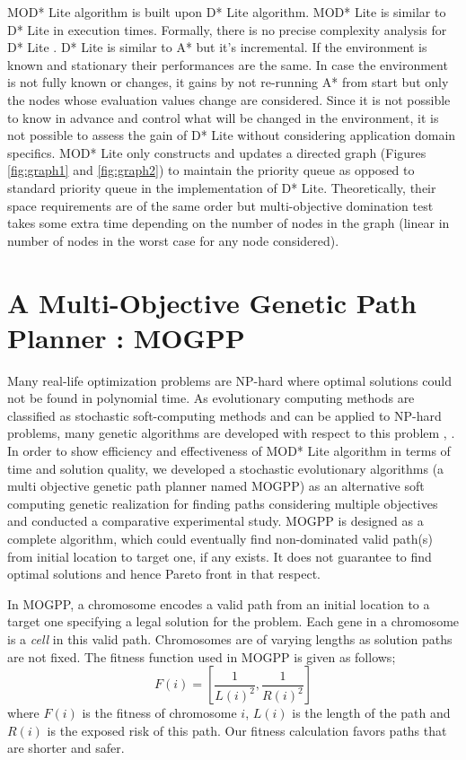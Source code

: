 \documentclass[10pt,journal]{IEEEtran}
\begin{document}
MOD* Lite algorithm is built upon D* Lite algorithm. MOD* Lite is similar to D* Lite in execution times. Formally, there is no precise complexity analysis for D* Lite \cite{Koenig:2002}.  D* Lite is similar to A* but it's incremental. If the environment is known and stationary their performances are the same. In case the environment is not fully known or changes, it gains by not re-running A* from start but only the nodes whose evaluation values change are considered. Since it is not possible to know in advance and control what will be changed in the environment, it is not possible to assess the gain of D* Lite without considering application domain specifics. MOD* Lite only constructs and updates a directed graph (Figures \ref{fig:graph1} and \ref{fig:graph2}) to maintain the priority queue as opposed to standard priority queue in the implementation of D* Lite. Theoretically, their space requirements are of the same order but multi-objective domination test takes some extra time depending on the number of nodes in the graph (linear in number of nodes in the worst case for any node considered).

\section{A Multi-Objective Genetic Path Planner : MOGPP}

Many real-life optimization problems are NP-hard where optimal solutions could not be found in polynomial time. As evolutionary computing methods are classified as stochastic soft-computing methods and can be applied to NP-hard problems, many genetic algorithms are developed with respect to this problem \cite{Pangilinan}, \cite{Peng_Xu_Zhang:2011}. In order to show efficiency and effectiveness of MOD* Lite algorithm in terms of time and solution quality, we developed a stochastic evolutionary algorithms (a multi objective genetic path planner named MOGPP)  as an alternative soft computing genetic realization for finding paths considering multiple objectives and conducted a comparative experimental study. MOGPP is designed as a complete algorithm, which could eventually find non-dominated valid path(s) from initial location to target one, if any exists. It does not guarantee to find optimal solutions and hence Pareto front in that respect.

In MOGPP, a chromosome encodes a valid path from an initial location to a target one specifying a legal solution for the problem. Each gene in a chromosome is a \textit{cell} in this valid path. Chromosomes are of varying lengths as solution paths are not fixed. The fitness function used in MOGPP is given as follows; \[F(i) = [\dfrac{1}{L(i)^{2}}, \dfrac{1}{R(i)^{2}}] \] where $F(i)$ is the fitness of chromosome $i$, $L(i)$ is the length of the path and $R(i)$ is the exposed risk of this path.  Our fitness calculation favors paths that are shorter and safer. 
\end{document}
